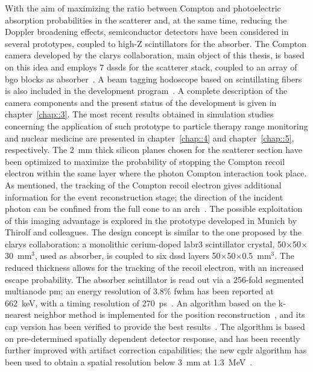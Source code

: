 With the aim of maximizing the ratio between Compton and photoelectric absorption probabilities in the scatterer and, at the same time, reducing the Doppler broadening effects, semiconductor detectors have been considered in several prototypes, coupled to high-Z scintillators for the absorber. The Compton camera developed by the \gls{clarys} collaboration, main object of this thesis, is based on this idea and employs 7 \glspl{dssd} for the scatterer stack, coupled to an array of \gls{bgo} blocks as absorber~\parencite{Krimmer2015, Fontana2018}. A beam tagging hodoscope based on scintillating fibers is also included in the development program~\parencite{Krimmer2014}. A complete description of the camera components and the present status of the development is given in chapter~\ref{chap::3}. The most recent results obtained in simulation studies concerning the application of such prototype to particle therapy range monitoring and nuclear medicine are presented in chapter~\ref{chap::4} and chapter~\ref{chap::5}, respectively. 
The 2~mm thick silicon planes chosen for the scatterer section have been optimized to maximize the probability of stopping the Compton recoil electron within the same layer where the photon Compton interaction took place. As mentioned, the tracking of the Compton recoil electron gives additional information for the event reconstruction stage; the direction of the incident photon can be confined from the full cone to an arch~\parencite{Frandes2010}. The possible exploitation of this imaging advantage is explored in the prototype developed in Munich by Thirolf and colleagues. The design concept is similar to the one proposed by the \gls{clarys} collaboration: a monolithic cerium-doped \gls{labr3} scintillator crystal, 50$\times$50$\times$30~mm$^3$, used as absorber, is coupled to six \gls{dssd} layers 50$\times$50$\times$0.5~mm$^3$. The reduced thickness allows for the tracking of the recoil electron, with an increased escape probability. The absorber scintillator is read out via a 256-fold segmented multianode \gls{pm}; an energy resolution of 3.8\%  \gls{fwhm} has been reported at 662~keV, with a timing resolution of 270~ps~\parencite{Thirolf2016}.  An algorithm based on the k-nearest neighbor method is implemented for the position reconstruction~\parencite{vanDam2011}, and its \gls{cap} version has been verified to provide the best results~\parencite{Aldawood2017}. The algorithm is based on pre-determined spatially dependent detector response, and has been recently further improved with artifact correction capabilities; the new \gls{cgdr} algorithm has been used to obtain a spatial resolution below 3~mm at 1.3~MeV~\parencite{Liprandi2017}. 
